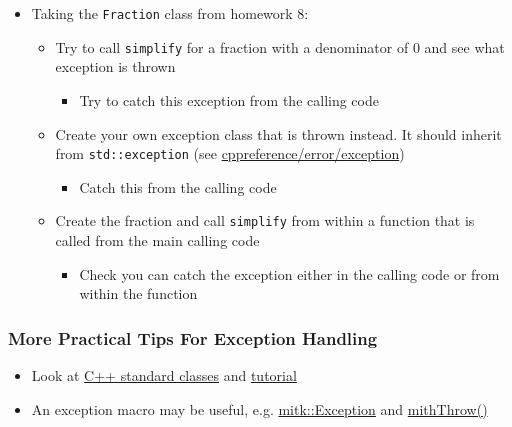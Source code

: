 \begin{itemize}
\itemsep1pt\parskip0pt
\item
  Taking the \texttt{Fraction} class from homework 8:

  \begin{itemize}
  \itemsep1pt\parskip0pt
  \item
    Try to call \texttt{simplify} for a fraction with a denominator of 0
    and see what exception is thrown

    \begin{itemize}
    \itemsep1pt\parskip0pt
    \item
      Try to catch this exception from the calling code
    \end{itemize}
  \item
    Create your own exception class that is thrown instead. It should
    inherit from \texttt{std::exception} (see
    \href{https://en.cppreference.com/w/cpp/error/exception}{cppreference/error/exception})

    \begin{itemize}
    \itemsep1pt\parskip0pt
    \item
      Catch this from the calling code
    \end{itemize}
  \item
    Create the fraction and call \texttt{simplify} from within a
    function that is called from the main calling code

    \begin{itemize}
    \itemsep1pt\parskip0pt
    \item
      Check you can catch the exception either in the calling code or
      from within the function
    \end{itemize}
  \end{itemize}
\end{itemize}

\subsubsection{More Practical Tips For Exception
Handling}\label{more-practical-tips-for-exception-handling}

\begin{itemize}
\itemsep1pt\parskip0pt
\item
  Look at \href{http://www.cplusplus.com/reference/exception/}{C++
  standard classes} and
  \href{http://www.cplusplus.com/doc/tutorial/exceptions/}{tutorial}
\item
  An exception macro may be useful, e.g.
  \href{https://github.com/MITK/MITK/blob/master/Modules/Core/include/mitkException.h}{mitk::Exception}
  and
  \href{https://github.com/MITK/MITK/blob/master/Modules/Core/include/mitkExceptionMacro.h}{mithThrow()}
\end{itemize}

